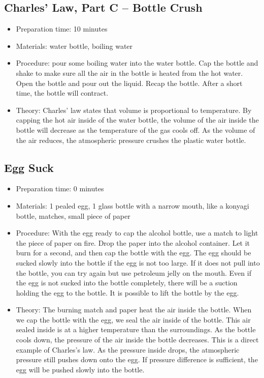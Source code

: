 \subsection{Charles' Law, Part C -- Bottle Crush}
\begin{itemize}
\item{Preparation time: 10 minutes}
\item{Materials: water bottle, boiling water}
\item{Procedure: pour some boiling water into the water bottle. Cap the bottle and shake to make sure all the air in the bottle is heated from the hot water. Open the bottle and pour out the liquid. Recap the bottle. After a short time, the bottle will contract.}
\item{Theory: Charles' law states that volume is proportional to temperature. By capping the hot air inside of the water bottle, the volume of the air inside the bottle will decrease as the temperature of the gas cools off. As the volume of the air reduces, the atmospheric pressure crushes the plastic water bottle.}
\end{itemize}

\subsection{Egg Suck}
\begin{itemize}
\item{Preparation time: 0 minutes}
\item{Materials: 1 pealed egg, 1 glass bottle with a narrow mouth, like a konyagi bottle, matches, small piece of paper}
\item{Procedure: With the egg ready to cap the alcohol bottle, use a match to light the piece of paper on fire. Drop the paper into the alcohol container. Let it burn for a second, and then cap the bottle with the egg. The egg should be sucked slowly into the bottle if the egg is not too large. If it does not pull into the bottle, you can try again but use petroleum jelly on the mouth. Even if the egg is not sucked into the bottle completely, there will be a suction holding the egg to the bottle. It is possible to lift the bottle by the egg.}
\item{Theory: The burning match and paper heat the air inside the bottle. When we cap the bottle with the egg, we seal the air inside of the bottle. This air sealed inside is at a higher temperature than the surroundings. As the bottle cools down, the pressure of the air inside the bottle decreases. This is a direct example of Charles's law. As the pressure inside drops, the atmospheric pressure still pushes down onto the egg. If pressure difference is sufficient, the egg will be pushed slowly into the bottle.}
\end{itemize}

